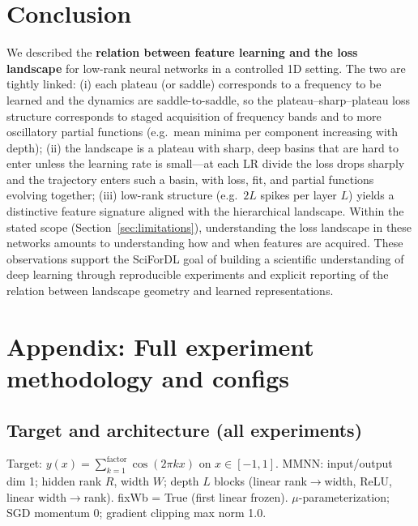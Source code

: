 \documentclass{article}
\begin{document}
\section{Conclusion}
\label{sec:conclusion}

We described the \textbf{relation between feature learning and the loss landscape} for low-rank neural networks in a controlled 1D setting. The two are tightly linked: (i) each plateau (or saddle) corresponds to a frequency to be learned and the dynamics are saddle-to-saddle, so the plateau--sharp--plateau loss structure corresponds to staged acquisition of frequency bands and to more oscillatory partial functions (e.g.\ mean minima per component increasing with depth); (ii) the landscape is a plateau with sharp, deep basins that are hard to enter unless the learning rate is small---at each LR divide the loss drops sharply and the trajectory enters such a basin, with loss, fit, and partial functions evolving together; (iii) low-rank structure (e.g.\ $2L$ spikes per layer $L$) yields a distinctive feature signature aligned with the hierarchical landscape. Within the stated scope (Section~\ref{sec:limitations}), understanding the loss landscape in these networks amounts to understanding how and when features are acquired. These observations support the SciForDL goal of building a scientific understanding of deep learning through reproducible experiments and explicit reporting of the relation between landscape geometry and learned representations.




\appendix
\section{Appendix: Full experiment methodology and configs}
\label{app:methodology}

\subsection{Target and architecture (all experiments)}
Target: $y(x) = \sum_{k=1}^{\mathrm{factor}} \cos(2\pi k x)$ on $x \in [-1,1]$. MMNN: input/output dim 1; hidden rank $R$, width $W$; depth $L$ blocks (linear rank$\to$width, ReLU, linear width$\to$rank). fixWb = True (first linear frozen). $\mu$-parameterization; SGD momentum 0; gradient clipping max norm 1.0.
\end{document}

